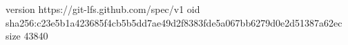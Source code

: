 version https://git-lfs.github.com/spec/v1
oid sha256:c23e5b1a423685f4cb5b5dd7ae49d2f8383fde5a067bb6279d0e2d51387a62ec
size 43840

